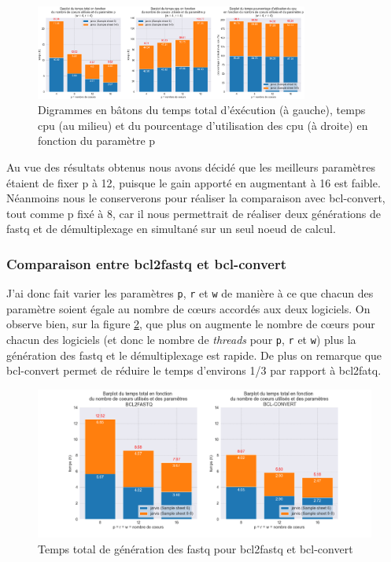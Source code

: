 \begin{figure}[H]
    \centering
    \includegraphics[width=0.8\textwidth]{img/barplot_cum_jarvis1.png}
    \caption{\footnotesize{Digrammes en bâtons du temps total d'éxécution (à gauche), temps cpu (au milieu) et du pourcentage d'utilisation des cpu (à droite) en fonction du paramètre p}}
    \label{barplot-param2}
\end{figure}

Au vue des résultats obtenus nous avons décidé que les meilleurs paramètres étaient de fixer p à 12, puisque le gain apporté en augmentant à 16 est faible. Néanmoins nous le conserverons pour réaliser la comparaison avec bcl-convert, tout comme p fixé à 8, car il nous permettrait de réaliser deux générations de fastq et de démultiplexage en simultané sur un seul noeud de calcul.\\

\subsubsection{Comparaison entre bcl2fastq et bcl-convert}
J'ai donc fait varier les paramètres \texttt{p}, \texttt{r} et \texttt{w} de manière à ce que chacun des paramètre soient égale au nombre de cœurs accordés aux deux logiciels. On observe bien, sur la figure \ref{fig-total-time}, que plus on augmente le nombre de cœurs pour chacun des logiciels (et donc le nombre de \emph{threads} pour \texttt{p}, \texttt{r} et \texttt{w}) plus la génération des fastq et le démultiplexage est rapide. De plus on remarque que bcl-convert permet de réduire le temps d'environs 1/3 par rapport à bcl2fatq. 

\begin{figure}[H]
    \centering
    \includegraphics[width=1\textwidth]{img/barplot_total_time_comp.png}
    \caption{\footnotesize{Temps total de génération des fastq pour bcl2fastq et bcl-convert}}
    \label{fig-total-time}
\end{figure}

